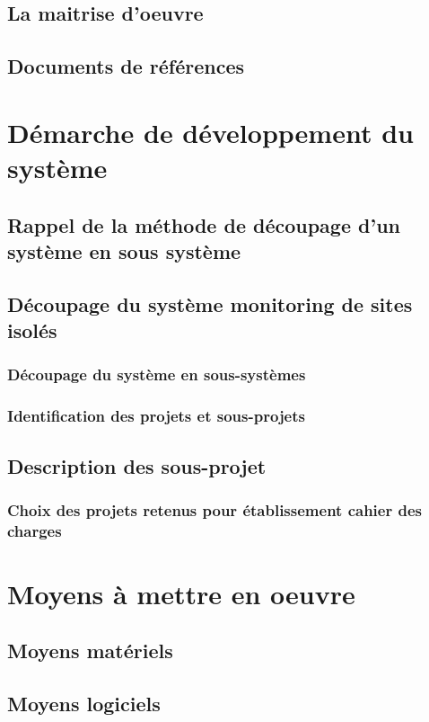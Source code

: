 \subsection{La maitrise d'oeuvre}

\subsection{Documents de références}
\section{Démarche de développement du système}

\subsection{Rappel de la méthode de découpage d'un système en sous système}

\subsection{Découpage du système monitoring de sites isolés}
\subsubsection{Découpage du système en sous-systèmes}
\subsubsection{Identification des projets et sous-projets}
\subsection{Description des sous-projet}
\subsubsection{Choix des projets retenus pour établissement cahier des charges}

\section{Moyens à mettre en oeuvre}
\subsection{Moyens matériels}
\subsection{Moyens logiciels}
